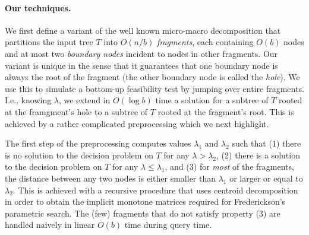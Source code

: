 \documentclass[11pt,a4paper]{article}
\theoremstyle{definition}
\theoremstyle{remark}
\begin{document}
 

%

\paragraph{Our techniques.}
We first define a variant of the well known micro-macro decomposition that partitions the input tree $T$ into $O(n/b)$ {\em fragments}, each containing $O(b)$ nodes and at most two {\em boundary nodes} incident to nodes in other fragments. Our variant is unique in the sense that it guarantees that one boundary node is always the root of the fragment (the other boundary node is called the {\em hole}). We use this to
 simulate a bottom-up feasibility test by jumping over entire 
fragments. I.e., knowing $\lambda$, we extend in $O(\log b)$ time a solution for a subtree of $T$ rooted at the framgment's hole to a subtree of $T$ rooted at the fragment's root. This is achieved by a rather complicated preprocessing which we next highlight.

The first step of the preprocessing computes values $\lambda_1$ and  $\lambda_2$ such that (1) there is no solution to the decision problem on $T$ for any $\lambda > \lambda_2$, (2) there is a solution to the decision problem on $T$ for any $\lambda \le \lambda_1$, and (3) for {\em most} of the fragments, the distance between any two nodes is either smaller than $\lambda_1$ or larger or equal to $\lambda_2$. This is achieved with a recursive procedure that uses centroid decomposition in order to obtain the implicit monotone matrices required for Frederickson's parametric search. The (few) fragments that do not satisfy property (3) are handled naively in linear $O(b)$ time during query time. 
\end{document}

